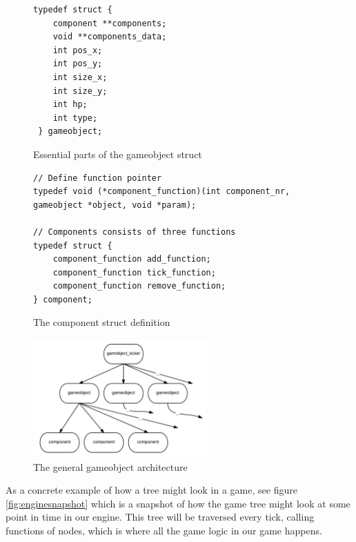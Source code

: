 \documentclass[a4paper,12pt]{article}
\begin{document}
\begin{figure}[h]
\centering
\begin{verbatim}
typedef struct {
    component **components;
    void **components_data;
    int pos_x;
    int pos_y;
    int size_x;
    int size_y;
    int hp;
    int type;
 } gameobject;
\end{verbatim}
\caption{Essential parts of the gameobject struct}
\label{fig:gameobjectdef}
\end{figure}

\begin{figure}[h]
\centering
\begin{verbatim}
// Define function pointer 
typedef void (*component_function)(int component_nr, gameobject *object, void *param); 
  
// Components consists of three functions 
typedef struct { 
    component_function add_function; 
    component_function tick_function; 
    component_function remove_function; 
} component;

\end{verbatim}
\caption{The component struct definition}
\label{fig:component}
\end{figure}

\begin{figure}
\centering
\includegraphics[width=0.6\textwidth]{gameobject_ticker}
\caption{The general gameobject architecture}
\label{fig:gameobjecttree}
\end{figure}

As a concrete example of how a tree might look in a game, see figure \ref{fig:enginesnapshot} which is a snapshot of how the game tree might look at some point in time in our engine. This tree will be traversed every tick, calling functions of nodes, which is where all the game logic in our game happens.
\end{document}
